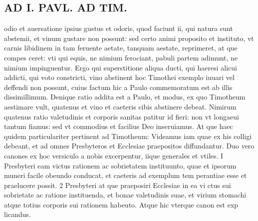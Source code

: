 \documentclass{article}
\begin{document}
\begin{pages}
\section*{AD I. PAVL. AD TIM. }\pstart odio et auersatione ipsius gustus et odoris, quod faciunt ii, qui natura sunt abstemii, et vinum gustare non possunt: sed certo animi proposito et instituto, vt carnis libidinem in tam feruente aetate, tanquam aestate, reprimeret, at que compes ceret: vti qui equis, ne nimium ferociant, pabuli partem adimunt, ne nimium impinguentur. Ergo qui superstitione aliqua ducti, qui haeresi alicui addicti, qui voto constricti, vino abstinent hoc Timothei exemplo iuuari vel deffendi non possunt, cuius factum hic a Paulo commemoratum est ab illis dissimillimum. Denique ratio addita est a Paulo, et modus, ex quo Timotheum aestimare vult, quatenus et vino et caeteris cibis abstinere debeat. Nimirum quatenus ratio valetudinis et corporis sanitas patitur id fieri: non vt longaeui tantum fiamus: sed vt commodius et facilius Deo inseruiamus. At que haec quidem particulariter pertinent ad Timotheum: Videamus iam quae ex his colligi debeant, et ad omnes Presbyteros et Ecclesiae praepositos diffundantur. Duo vero canones ex hoc versiculo a nobis excerpentur, iique generales et vtiles. I Presbyteri eam victus rationem ac sobrietatem instituunto, quae et ipsorum muneri facile obeundo conducat, et caeteris ad exemplum tem perantiae esse et praelucere possit. 2 Presbyteri at que praeposiri Ecclesiae in ea vi ctus sui sobrietate ac ratione instituenda, et bonae valetudinis suae, et virium stomachi atque totius corporis sui rationem habeuto. Atque hic vterque canon est exp licandus.  \pend

\end{pages}
\end{document}
